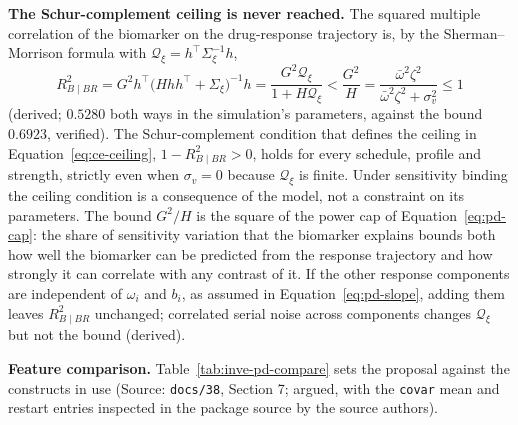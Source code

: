 \documentclass[11pt]{article}
\newcommand{\code}[1]{\texttt{#1}}
\begin{document}
\textbf{The Schur-complement ceiling is never reached.} The squared
multiple correlation of the biomarker on the drug-response trajectory
is, by the Sherman--Morrison formula with
$\mathcal Q_\xi = h^\top\Sigma_\xi^{-1}h$,
\begin{equation}
R^2_{B\mid BR} = G^2 h^\top\big(Hhh^\top + \Sigma_\xi\big)^{-1}h
= \frac{G^2 \mathcal Q_\xi}{1 + H\mathcal Q_\xi} < \frac{G^2}{H}
= \frac{\bar\omega^2\zeta^2}{\bar\omega^2\zeta^2 + \sigma_v^2} \le 1
\label{eq:inve-pd-r2}
\end{equation}
(derived; $0.5280$ both ways in the simulation's parameters, against
the bound $0.6923$, verified). The Schur-complement condition that
defines the ceiling in Equation~\eqref{eq:ce-ceiling},
$1 - R^2_{B\mid BR} > 0$, holds for every schedule, profile and
strength, strictly even when $\sigma_v = 0$ because $\mathcal Q_\xi$ is finite.
Under sensitivity binding the ceiling condition is a consequence of the
model, not a constraint on its parameters. The bound $G^2/H$ is the
square of the power cap of Equation~\eqref{eq:pd-cap}: the share of
sensitivity variation that the biomarker explains bounds both how well
the biomarker can be predicted from the response trajectory and how
strongly it can correlate with any contrast of it. If the other
response components are independent of $\omega_i$ and $b_i$, as
assumed in Equation~\eqref{eq:pd-slope}, adding them leaves
$R^2_{B\mid BR}$ unchanged; correlated serial noise across components
changes $\mathcal Q_\xi$ but not the bound (derived).

\textbf{Feature comparison.} Table~\ref{tab:inve-pd-compare} sets the
proposal against the constructs in use (Source: \code{docs/38}, Section
7; argued, with the \code{covar} mean and restart entries inspected in
the package source by the source authors).
\end{document}
